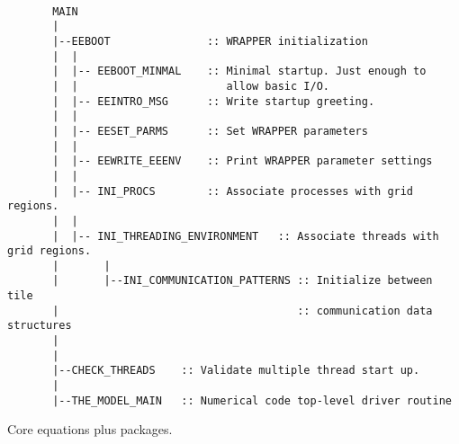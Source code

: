 \begin{verbatim}

       MAIN  
       |
       |--EEBOOT               :: WRAPPER initialization
       |  |
       |  |-- EEBOOT_MINMAL    :: Minimal startup. Just enough to
       |  |                       allow basic I/O.
       |  |-- EEINTRO_MSG      :: Write startup greeting.
       |  |
       |  |-- EESET_PARMS      :: Set WRAPPER parameters
       |  |
       |  |-- EEWRITE_EEENV    :: Print WRAPPER parameter settings
       |  |
       |  |-- INI_PROCS        :: Associate processes with grid regions.
       |  |
       |  |-- INI_THREADING_ENVIRONMENT   :: Associate threads with grid regions.
       |       |
       |       |--INI_COMMUNICATION_PATTERNS :: Initialize between tile 
       |                                     :: communication data structures
       |
       |
       |--CHECK_THREADS    :: Validate multiple thread start up.
       |
       |--THE_MODEL_MAIN   :: Numerical code top-level driver routine

\end{verbatim}

Core equations plus packages.

